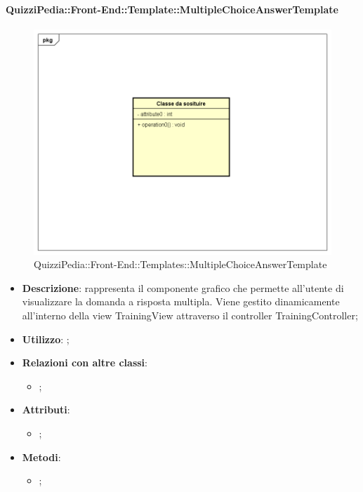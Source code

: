 		\paragraph{QuizziPedia::Front-End::Template::MultipleChoiceAnswerTemplate}
		
				\label{QuizziPedia::Front-End::Templates::MultipleChoiceAnswerTemplate}

				\begin{figure}[h]
					\centering
					\includegraphics[scale=0.5,keepaspectratio]{UML/Classi/Front-End/Temporanea.png}
					\caption{QuizziPedia::Front-End::Templates::MultipleChoiceAnswerTemplate}
				\end{figure}
						
			\begin{itemize}
				\item \textbf{Descrizione}: rappresenta il componente grafico che permette all'utente di visualizzare la domanda a risposta multipla. Viene gestito dinamicamente all'interno della view TrainingView attraverso il controller TrainingController;
				\item \textbf{Utilizzo}: ;
				\item \textbf{Relazioni con altre classi}: 
				\begin{itemize}
					\item ;
				\end{itemize}
				\item \textbf{Attributi}: 
				\begin{itemize}
					\item ;
				\end{itemize}
				\item \textbf{Metodi}: 
				\begin{itemize}
					\item ;
				\end{itemize}
			\end{itemize}
		
